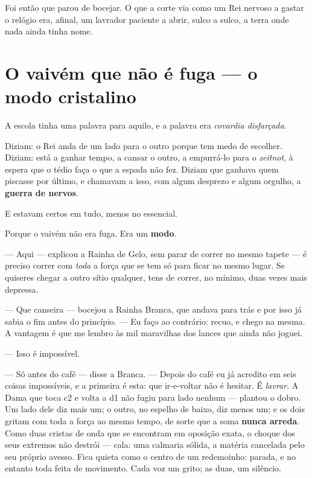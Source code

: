 \documentclass[livro.tex]{subfiles}
\begin{document}
Foi então que \Joa parou de bocejar. O que a corte via como um Rei nervoso a
gastar o relógio era, afinal, um lavrador paciente a abrir, sulco a sulco, a terra
onde nada ainda tinha nome.

\chapter{O vaivém que não é fuga --- o modo cristalino}

A escola tinha uma palavra para aquilo, e a palavra era \emph{covardia
disfarçada}.

Diziam: o Rei anda de um lado para o outro porque tem medo de escolher. Diziam:
está a ganhar tempo, a cansar o outro, a empurrá-lo para o \emph{zeitnot}, à espera
que o tédio faça o que a espada não fez. Diziam que ganhava quem piscasse por
último, e chamavam a isso, com algum desprezo e algum orgulho, a \textbf{guerra de
nervos}.

E estavam certos em tudo, menos no essencial.

\medskip

Porque o vaivém não era fuga. Era um \textbf{modo}.

--- Aqui --- explicou a Rainha de Gelo, sem parar de correr no mesmo tapete --- é
preciso correr com \emph{toda} a força que se tem só para ficar no mesmo lugar. Se
quiseres chegar a outro sítio qualquer, tens de correr, no mínimo, duas vezes mais
depressa.

--- Que canseira --- bocejou a Rainha Branca, que andava para trás e por isso já sabia
o fim antes do princípio. --- Eu faço ao contrário: recuo, e chego na mesma. A
vantagem é que me lembro às mil maravilhas dos lances que ainda não joguei.

--- Isso é impossível.

--- Só antes do café --- disse a Branca. --- Depois do café eu já acredito em seis
coisas impossíveis, e a primeira é esta: que ir-e-voltar não é hesitar. É \emph{lavrar}.
A Dama que toca \textsf{c2} e volta a \textsf{d1} não fugiu para lado nenhum --- plantou o dobro. Um
lado dele diz mais um; o outro, no espelho de baixo, diz menos um; e os dois gritam com toda
a força ao mesmo tempo, de sorte que a soma
\textbf{nunca arreda}. Como duas cristas de onda que se encontram em oposição exata, o
choque dos seus extremos não destrói --- cala: uma calmaria sólida, a matéria cancelada
pelo seu próprio avesso. Fica quieta como o centro de um redemoinho: parada, e no
entanto toda feita de movimento. Cada voz um grito; as duas, um silêncio.
\end{document}
